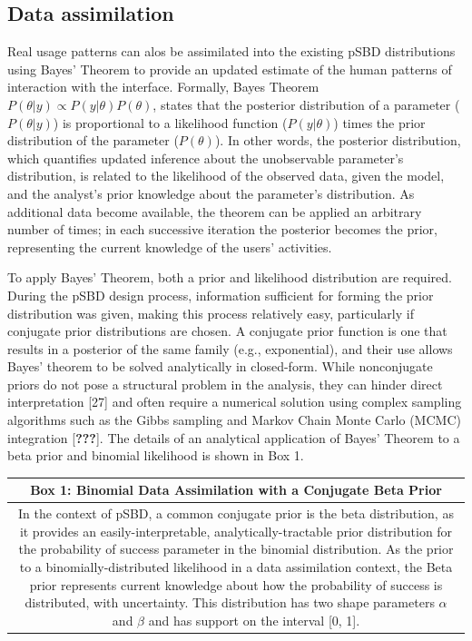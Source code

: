 \documentclass[]{article}
\begin{document}
\subsection{Data assimilation}\label{data-assimilation}

Real usage patterns can alos be assimilated into the existing pSBD
distributions using Bayes' Theorem to provide an updated estimate of the
human patterns of interaction with the interface. Formally, Bayes
Theorem \(P(\theta \vert y) \propto P(y \vert \theta)P(\theta)\), states
that the posterior distribution of a parameter (\(P(\theta \vert y)\))
is proportional to a likelihood function (\(P(y \vert \theta)\)) times
the prior distribution of the parameter (\(P(\theta)\)). In other words,
the posterior distribution, which quantifies updated inference about the
unobservable parameter's distribution, is related to the likelihood of
the observed data, given the model, and the analyst's prior knowledge
about the parameter's distribution. As additional data become available,
the theorem can be applied an arbitrary number of times; in each
successive iteration the posterior becomes the prior, representing the
current knowledge of the users' activities.

To apply Bayes' Theorem, both a prior and likelihood distribution are
required. During the pSBD design process, information sufficient for
forming the prior distribution was given, making this process relatively
easy, particularly if conjugate prior distributions are chosen. A
conjugate prior function is one that results in a posterior of the same
family (e.g., exponential), and their use allows Bayes' theorem to be
solved analytically in closed-form. While nonconjugate priors do not
pose a structural problem in the analysis, they can hinder direct
interpretation {[}27{]} and often require a numerical solution using
complex sampling algorithms such as the Gibbs sampling and Markov Chain
Monte Carlo (MCMC) integration {[}{\textbf{???}}{]}. The details of an
analytical application of Bayes' Theorem to a beta prior and binomial
likelihood is shown in Box 1.

\begin{longtable}[]{@{}c@{}}
\toprule
\begin{minipage}[b]{0.97\columnwidth}\centering\strut
Box 1: Binomial Data Assimilation with a Conjugate Beta Prior\strut
\end{minipage}\tabularnewline
\midrule
\endhead
\begin{minipage}[t]{0.97\columnwidth}\centering\strut
In the context of pSBD, a common conjugate prior is the beta
distribution, as it provides an easily-interpretable,
analytically-tractable prior distribution for the probability of success
parameter in the binomial distribution. As the prior to a
binomially-distributed likelihood in a data assimilation context, the
Beta prior represents current knowledge about how the probability of
success is distributed, with uncertainty. This distribution has two
shape parameters \(\alpha\) and \(\beta\) and has support on the
interval {[}0, 1{]}.\strut
\end{minipage}\tabularnewline
\bottomrule
\end{longtable}
\end{document}
